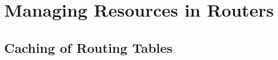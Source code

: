 \documentclass[a4paper,11pt]{book}
\begin{document}


\part{Managing Resources in Routers}

\chapter{Caching of Routing Tables}
\label{ch:packet-forwarding}






%



\end{document}
